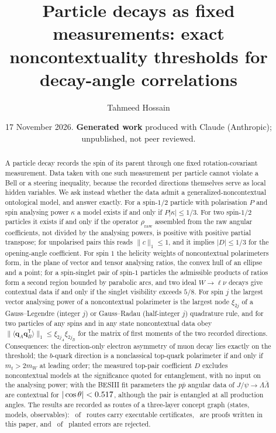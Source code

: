 \documentclass[aps,pra,10pt,twocolumn,superscriptaddress,nofootinbib,floatfix]{revtex4-2}
\theoremstyle{definition}
\theoremstyle{remark}
\newcommand{\bq}{\bm{q}}
\newcommand{\rhoraw}{\rho_{\mathrm{raw}}}
\newcommand{\T}{\mathsf{T}}
\begin{document}
\title{Particle decays as fixed measurements: exact noncontextuality thresholds for decay-angle correlations}

\author{Tahmeed Hossain}

\date{17 November 2026. \textbf{Generated work} produced with Claude (Anthropic); unpublished, not peer reviewed.}

\begin{abstract}
A particle decay records the spin of its parent through one fixed rotation-covariant measurement.
Data taken with one such measurement per particle cannot violate a Bell or a steering inequality, because the recorded directions themselves serve as local hidden variables.
We ask instead whether the data admit a generalized-noncontextual ontological model, and answer exactly.
For a spin-$1/2$ particle with polarisation $P$ and spin analysing power $\kappa$ a model exists if and only if $P|\kappa|\le 1/3$.
For two spin-$1/2$ particles it exists if and only if the operator $\rhoraw$ assembled from the raw angular coefficients, not divided by the analysing powers, is positive with positive partial transpose; for unpolarised pairs this reads $\|c\|_1\le 1$, and it implies $|D|\le 1/3$ for the opening-angle coefficient.
For spin $1$ the helicity weights of noncontextual polarimeters form, in the plane of vector and tensor analysing ratios, the convex hull of an ellipse and a point; for a spin-singlet pair of spin-$1$ particles the admissible products of ratios form a second region bounded by parabolic arcs, and two ideal $W\to\ell\nu$ decays give contextual data if and only if the singlet visibility exceeds $5/8$.
For spin $j$ the largest vector analysing power of a noncontextual polarimeter is the largest node $\xi_{2j}$ of a Gauss--Legendre (integer $j$) or Gauss--Radau (half-integer $j$) quadrature rule, and for two particles of any spins and in any state noncontextual data obey $\|\langle\bq_A\bq_B^{\T}\rangle\|_1\le\xi_{2j_A}\xi_{2j_B}$ for the matrix of first moments of the two recorded directions.
Consequences: the direction-only electron asymmetry of muon decay lies exactly on the threshold; the $b$-quark direction is a nonclassical top-quark polarimeter if and only if $m_t>2m_W$ at leading order; the measured top-pair coefficient $D$ excludes noncontextual models at the significance quoted for entanglement, with no input on the analysing power; with the BESIII fit parameters the $p\bar p$ angular data of $J/\psi\to\Lambda\bar\Lambda$ are contextual for $|\cos\theta|<0.517$, although the pair is entangled at all production angles.
The results are recorded as routes of a three-layer concept graph (states, models, observables): \nChecked\ of \nRoutes\ routes carry executable certificates, \nWritten\ are proofs written in this paper, and \nControlsRejected\ of \nControls\ planted errors are rejected.
\end{abstract}
\end{document}
